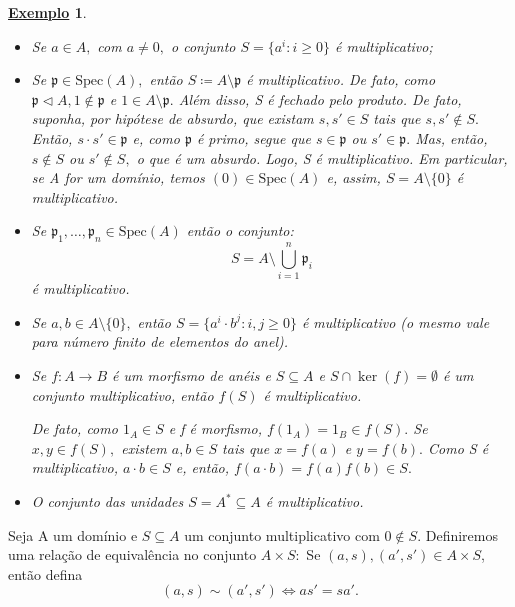 \documentclass{article}
\newtheorem{example}{\underline{Exemplo}}
\begin{document}
    \begin{example}
      \begin{itemize}
        \item[1)] Se \(a\in A,\) com \(a\neq 0,\) o conjunto \(S = \{a^{i}: i\geq 0\}\) é multiplicativo;
        \item[2)] Se \(\mathfrak{p}\in \mathrm{Spec}(A),\) então \(S\coloneqq A\setminus{\mathfrak{p}}\) é multiplicativo. De fato, como
          \(\mathfrak{p}\vartriangleleft A, 1\not\in \mathfrak{p}\) e \(1\in A\setminus{\mathfrak{p}}.\)
          Além disso, S é fechado pelo produto. De fato, suponha, por hipótese de absurdo, que existam \(s, s'\in S\) tais que \(s, s'\not\in S.\) Então,
          \(s \cdot s'\in \mathfrak{p}\) e, como \(\mathfrak{p}\) é primo, segue que \(s\in \mathfrak{p}\) ou \(s'\in \mathfrak{p}.\) Mas, então, \(s\not\in S\) ou
          \(s'\not\in S,\) o que é um absurdo. Logo, S é multiplicativo. Em particular, se A for um domínio, temos \((0)\in \mathrm{Spec}(A)\) e, assim,
          \(S=A\setminus{\{0\}}\) é multiplicativo.
        \item[3)] Se \(\mathfrak{p}_{1}, \dotsc , \mathfrak{p}_{n}\in \mathrm{Spec}(A)\) então o conjunto:
          \[
            S = A\setminus{\bigcup_{i=1}^{n}\mathfrak{p}_{i}}
          \]
          é multiplicativo.
        \item[4)] Se \(a, b\in A \setminus{\{0\}},\) então \(S = \{a^{i}\cdot b^{j}: i, j\geq 0\}\) é multiplicativo (o mesmo vale para número finito de
          elementos do anel).
        \item[5)] Se \(f:A\rightarrow B\) é um morfismo de anéis e \(S\subseteq A\) e \(S\cap \ker{(f)} = \emptyset\) é um conjunto multiplicativo,
          então \(f(S)\) é multiplicativo.

          De fato, como \(1_{A}\in S\) e f é morfismo, \(f(1_{A}) = 1_{B}\in f(S).\) Se \(x, y\in f(S),\) existem
          \(a, b\in S\) tais que \(x=f(a)\) e \(y=f(b).\) Como S é multiplicativo, \(a \cdot b\in S\) e, então, \(f(a \cdot b) = f(a)f(b)\in S.\) 
        \item[6)] O conjunto das unidades \(S = A^{*}\subseteq A\) é multiplicativo.
      \end{itemize}
    \end{example}
    Seja A um domínio e \(S\subseteq A\) um conjunto multiplicativo com \(0\not\in S.\) Definiremos uma relação de equivalência no conjunto
    \(A\times S:\) Se \((a, s), (a', s')\in A\times S\), então defina 
    \[
      (a, s)\sim (a', s') \Longleftrightarrow as' = sa'.
    \]
\end{document}
